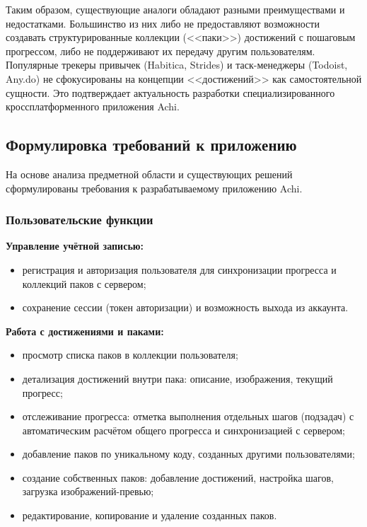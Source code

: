 \documentclass[../main.tex]{subfiles}
\begin{document}
Таким образом, существующие аналоги обладают разными преимуществами и недостатками. Большинство из них либо не предоставляют возможности создавать структурированные коллекции (<<паки>>) достижений с пошаговым прогрессом, либо не поддерживают их передачу другим пользователям. Популярные трекеры привычек (Habitica, Strides) и таск-менеджеры (Todoist, Any.do) не сфокусированы на концепции <<достижений>> как самостоятельной сущности. Это подтверждает актуальность разработки специализированного кроссплатформенного приложения Achi.

\subsection{Формулировка требований к приложению}

На основе анализа предметной области и существующих решений сформулированы требования к разрабатываемому приложению Achi.

\subsubsection{Пользовательские функции}

\textbf{Управление учётной записью:}
\begin{itemize}[leftmargin=*]
	\item регистрация и авторизация пользователя для синхронизации прогресса и коллекций паков с сервером;
	\item сохранение сессии (токен авторизации) и возможность выхода из аккаунта.
\end{itemize}

\textbf{Работа с достижениями и паками:}
\begin{itemize}[leftmargin=*]
	\item просмотр списка паков в коллекции пользователя;
	\item детализация достижений внутри пака: описание, изображения, текущий прогресс;
	\item отслеживание прогресса: отметка выполнения отдельных шагов (подзадач) с автоматическим расчётом общего прогресса и синхронизацией с сервером;
	\item добавление паков по уникальному коду, созданных другими пользователями;
	\item создание собственных паков: добавление достижений, настройка шагов, загрузка изображений-превью;
	\item редактирование, копирование и удаление созданных паков.
\end{itemize}
\end{document}
